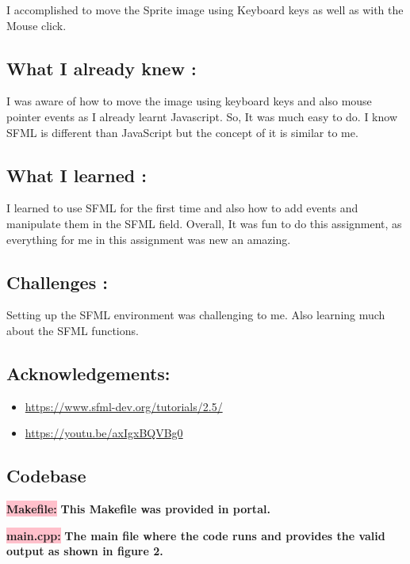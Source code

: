 I accomplished to move the Sprite image using Keyboard keys as well as with the Mouse click.

\subsection{What I already knew :}\label{sec:ps0:knew}

I was aware of how to move the image using keyboard keys and also mouse pointer events as I already learnt Javascript. So, It was much easy to do. I know SFML is different than JavaScript but the concept of it is similar to me.

\subsection{What I learned :}\label{sec:ps0:learn}

I learned to use SFML for the first time and also how to add events and manipulate them in the SFML field.
Overall, It was fun to do this assignment, as everything for me in this assignment was new an amazing.

\subsection{Challenges :}\label{sec:ps0:challenges}

Setting up the SFML environment was challenging to me. Also learning much about the SFML functions.
\subsection{Acknowledgements:}
\begin{itemize}
    \item \url{https://www.sfml-dev.org/tutorials/2.5/}
    \item \url{https://youtu.be/axIgxBQVBg0}
\end{itemize}
\newpage

\subsection{Codebase}\label{sec:ps0:code}

\colorbox{pink}{\textbf{Makefile:}} \newline \textbf{This Makefile was provided in portal.}
 

\colorbox{pink}{\textbf{main.cpp:}} \newline \textbf{The main file where the code runs and provides the valid output as shown in figure 2.}



